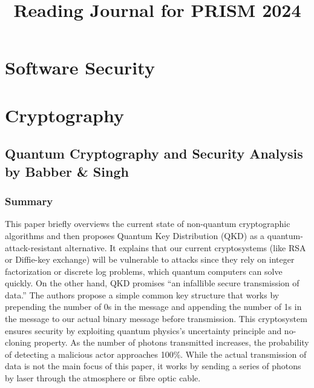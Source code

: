 \documentclass{article}
\begin{document}

\title{Reading Journal for PRISM 2024}
\author{}
\date{}
\maketitle

\section{Software Security}

\section{Cryptography}
\subsection*{Quantum Cryptography and Security Analysis by Babber \& Singh}

\subsubsection*{Summary}
This paper briefly overviews the current state of non-quantum cryptographic algorithms and then proposes Quantum Key Distribution (QKD) 
as a quantum-attack-resistant alternative. It explains that our current cryptosystems (like RSA or Diffie-key exchange) will be vulnerable 
to attacks since they rely on integer factorization or discrete log problems, which quantum computers can solve quickly. On the other hand, 
QKD promises “an infallible secure transmission of data.” The authors propose a simple common key structure that works by prepending the number 
of 0s in the message and appending the number of 1s in the message to our actual binary message before transmission. This cryptosystem ensures 
security by exploiting quantum physics's uncertainty principle and no-cloning property. As the number of photons transmitted increases, the 
probability of detecting a malicious actor approaches 100\%. While the actual transmission of data is not the main focus of this paper, it 
works by sending a series of photons by laser through the atmosphere or fibre optic cable. 
\end{document}
